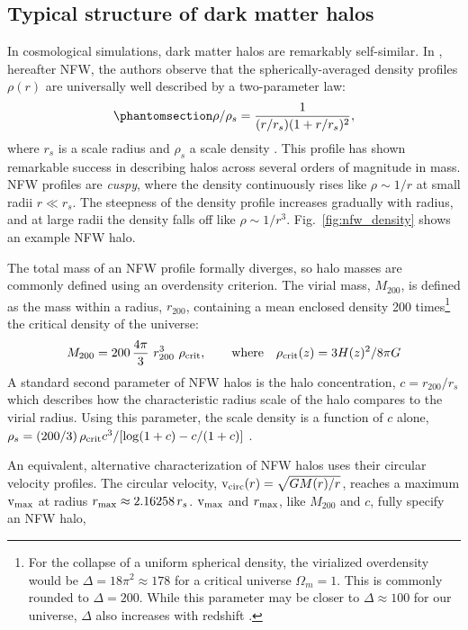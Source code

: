 \subsection{Typical structure of dark matter
halos}\label{typical-structure-of-dark-matter-halos}

In \LCDM cosmological simulations, dark matter halos are remarkably
self-similar. In \citet{NFW1996, NFW1997}, hereafter NFW, the authors
observe that the spherically-averaged density profiles \(\rho(r)\) are
universally well described by a two-parameter law:
\begin{equation}\protect\phantomsection\label{eq:nfw}{
\rho/\rho_s= \frac{1}{(r/r_s)(1+r/r_s)^2},
}\end{equation} where \(r_s\) is a scale radius and \(\rho_s\) a scale
density . This profile has shown remarkable success in describing
\LCDM halos across several orders of magnitude in mass. NFW profiles are
\emph{cuspy}, where the density continuously rises like
\(\rho \sim 1/r\) at small radii \(r \ll r_s\). The steepness of the
density profile increases gradually with radius, and at large radii the
density falls off like \(\rho \sim 1/r^3\). Fig.~\ref{fig:nfw_density}
shows an example NFW halo.

The total mass of an NFW profile formally diverges, so halo masses are
commonly defined using an overdensity criterion. The virial mass,
\(M_{200}\), is defined as the mass within a radius, \(r_{200}\),
containing a mean enclosed density 200 times\footnote{For the collapse
  of a uniform spherical density, the virialized overdensity would be
  \(\Delta = 18\pi^2\approx 178\) for a critical universe
  \(\Omega_m = 1\). This is commonly rounded to \(\Delta = 200\). While
  this parameter may be closer to \(\Delta \approx 100\) for our
  universe, \(\Delta\) also increases with redshift \citep[using eq. 6
  from][]{bryan+norman1998}.} the critical density of the universe:
\begin{equation}{
M_{200} =200\,\frac{4\pi}{3} \ r_{200}^3\ \rho_{\rm crit}, \qquad {\rm where} \quad \rho_{\rm crit}(z) = 3H(z)^2 / 8\pi G
}\end{equation} A standard second parameter of NFW halos is the halo
concentration, \(c=r_{200} / r_s\) which describes how the
characteristic radius scale of the halo compares to the virial radius.
Using this parameter, the scale density is a function of \(c\) alone,
\(\rho_s = (200/3)\,\rho_{\rm crit} c^3 / [\log(1+c) - c/(1+c)]\)
\citep{NFW1996}.

An equivalent, alternative characterization of NFW halos uses their
circular velocity profiles. The circular velocity,
\({\rm v}_{\rm circ}(r) = \sqrt{G M(r) / r}\), reaches a maximum
\({\rm v}_{\rm max}\) at radius \(r_{\rm max} \approx 2.16258\,r_s\).
\({\rm v}_{\rm max}\) and \(r_{\rm max}\), like \(M_{200}\) and \(c\), fully
specify an NFW halo,

